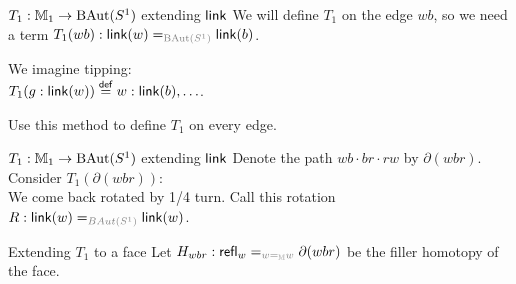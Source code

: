 \begin{frame}{\( T_1:\mathbb{M}_1\to\operatorname{BAut}(S^1) \) extending \( \operatorname{\mathsf{link}} \)}
We will define \( T_1 \) on the edge \( wb \), so we need a term \( T_1(wb):\link(w)=_\lgt{\BAut(S^1)}\link(b) \).

We imagine tipping:
\[\]
\( T_1(g:\operatorname{\mathsf{link}}(w))\stackrel{\mathsf{def}}{=} w:\operatorname{\mathsf{link}}(b),\ldots \).

Use this method to define \( T_1 \) on every edge.
\end{frame}

\begin{frame}{\( T_1:\mathbb{M}_1\to\operatorname{BAut}(S^1) \) extending \( \operatorname{\mathsf{link}} \)}
Denote the path \( wb\cdot br\cdot rw \) by \alert{\( \partial(wbr) \)}.
Consider \( T_1(\partial(wbr)) \):
\[\]
We come back rotated by 1/4 turn. Call this rotation \( R:\link(w)=_\lgt{BAut(S^1)}\link(w) \).
\end{frame}

\begin{frame}{Extending \( T_1 \) to a face}
Let \( H_{wbr}:\refl_{w}=_\lgt{w=_{\mm}w}\partial(wbr) \) be the filler homotopy of the face.




\[\]
\end{frame}

% 
% 


